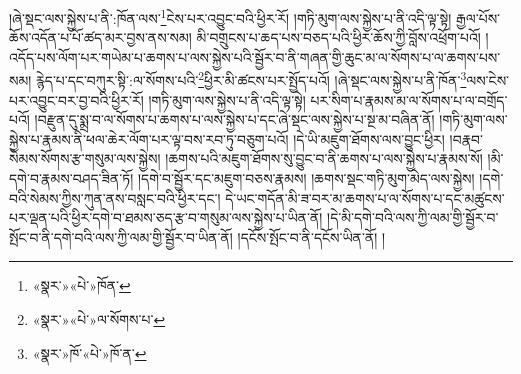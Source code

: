 །ཞེ་སྡང་ལས་སྐྱེས་པ་ནི་:ཁོན་ལས་\footnote{«སྣར་»«པེ་»ཁོན་}ངེས་པར་འབྱུང་བའི་ཕྱིར་རོ། །གཏི་མུག་ལས་སྐྱེས་པ་ནི་འདི་ལྟ་སྟེ། རྒྱལ་པོས་ཆོས་འདོན་པ་པོ་ཚད་མར་བྱས་ནས་སམ། མི་བགྲུངས་པ་ཆད་པས་བཅད་པའི་ཕྱིར་ཆོས་ཀྱི་བློས་འཕྲོག་པའོ། །འདོད་པས་ལོག་པར་གཡེམ་པ་ཆགས་པ་ལས་སྐྱེས་པའི་སྦྱོར་བ་ནི་གཞན་གྱི་ཆུང་མ་ལ་སོགས་པ་ལ་ཆགས་པས་སམ། རྙེད་པ་དང་བཀུར་སྟི་:ལ་སོགས་པའི་\footnote{«སྣར་»«པེ་»ལ་སོགས་པ་}ཕྱིར་མི་ཚངས་པར་སྤྱོད་པའོ། །ཞེ་སྡང་ལས་སྐྱེས་པ་ནི་ཁོན་\footnote{«སྣར་»ཁོ་«པེ་»ཁོ་ན་}ལས་ངེས་པར་འབྱུང་བར་བྱ་བའི་ཕྱིར་རོ། །གཏི་མུག་ལས་སྐྱེས་པ་ནི་འདི་ལྟ་སྟེ། པར་སིག་པ་རྣམས་མ་ལ་སོགས་པ་ལ་བགྲོད་པའོ། །བརྫུན་དུ་སྨྲ་བ་ལ་སོགས་པ་ཆགས་པ་ལས་སྐྱེས་པ་དང་ཞེ་སྡང་ལས་སྐྱེས་པ་སྔ་མ་བཞིན་ནོ། །གཏི་མུག་ལས་སྐྱེས་པ་རྣམས་ནི་ཕལ་ཆེར་ལོག་པར་ལྟ་བས་རབ་ཏུ་བཅུག་པའོ། །དེ་ཡི་མཇུག་ཐོགས་ལས་བྱུང་ཕྱིར། །བརྣབ་སེམས་སོགས་རྩ་གསུམ་ལས་སྐྱེས། །ཆགས་པའི་མཇུག་ཐོགས་སུ་བྱུང་བ་ནི་ཆགས་པ་ལས་སྐྱེས་པ་རྣམས་སོ། །མི་དགེ་བ་རྣམས་བཤད་ཟིན་ཏོ། །དགེ་བ་སྦྱོར་དང་མཇུག་བཅས་རྣམས། །ཆགས་སྡང་གཏི་མུག་མེད་ལས་སྐྱེས། །དགེ་བའི་སེམས་ཀྱིས་ཀུན་ནས་བསླང་བའི་ཕྱིར་དང་། དེ་ཡང་གདོན་མི་ཟ་བར་མ་ཆགས་པ་ལ་སོགས་པ་དང་མཚུངས་པར་ལྡན་པའི་ཕྱིར་དགེ་བ་ཐམས་ཅད་རྩ་བ་གསུམ་ལས་སྐྱེས་པ་ཡིན་ནོ། །དེ་མི་དགེ་བའི་ལས་ཀྱི་ལམ་གྱི་སྦྱོར་བ་སྤོང་བ་ནི་དགེ་བའི་ལས་ཀྱི་ལམ་གྱི་སྦྱོར་བ་ཡིན་ནོ། །དངོས་སྤོང་བ་ནི་དངོས་ཡིན་ནོ། །
